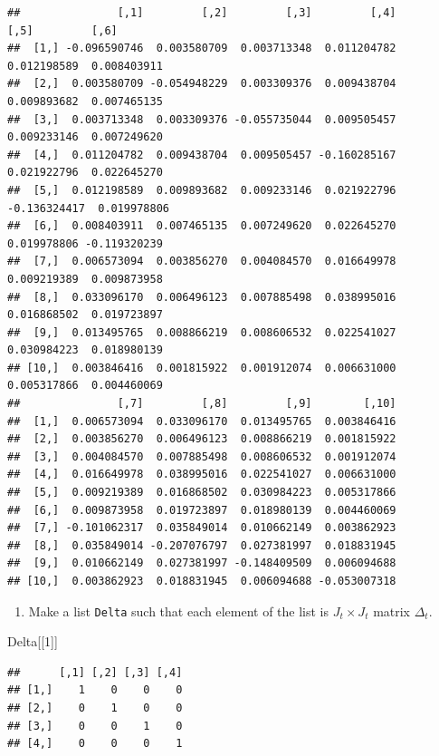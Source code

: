\documentclass[
]{book}
\newenvironment{Shaded}{\begin{snugshade}}{\end{snugshade}}
\newcommand{\DecValTok}[1]{\textcolor[rgb]{0.00,0.00,0.81}{#1}}
\newcommand{\NormalTok}[1]{#1}
\providecommand{\tightlist}{%
  \setlength{\itemsep}{0pt}\setlength{\parskip}{0pt}}
\begin{document}
\begin{verbatim}
##               [,1]         [,2]         [,3]         [,4]         [,5]         [,6]
##  [1,] -0.096590746  0.003580709  0.003713348  0.011204782  0.012198589  0.008403911
##  [2,]  0.003580709 -0.054948229  0.003309376  0.009438704  0.009893682  0.007465135
##  [3,]  0.003713348  0.003309376 -0.055735044  0.009505457  0.009233146  0.007249620
##  [4,]  0.011204782  0.009438704  0.009505457 -0.160285167  0.021922796  0.022645270
##  [5,]  0.012198589  0.009893682  0.009233146  0.021922796 -0.136324417  0.019978806
##  [6,]  0.008403911  0.007465135  0.007249620  0.022645270  0.019978806 -0.119320239
##  [7,]  0.006573094  0.003856270  0.004084570  0.016649978  0.009219389  0.009873958
##  [8,]  0.033096170  0.006496123  0.007885498  0.038995016  0.016868502  0.019723897
##  [9,]  0.013495765  0.008866219  0.008606532  0.022541027  0.030984223  0.018980139
## [10,]  0.003846416  0.001815922  0.001912074  0.006631000  0.005317866  0.004460069
##               [,7]         [,8]         [,9]        [,10]
##  [1,]  0.006573094  0.033096170  0.013495765  0.003846416
##  [2,]  0.003856270  0.006496123  0.008866219  0.001815922
##  [3,]  0.004084570  0.007885498  0.008606532  0.001912074
##  [4,]  0.016649978  0.038995016  0.022541027  0.006631000
##  [5,]  0.009219389  0.016868502  0.030984223  0.005317866
##  [6,]  0.009873958  0.019723897  0.018980139  0.004460069
##  [7,] -0.101062317  0.035849014  0.010662149  0.003862923
##  [8,]  0.035849014 -0.207076797  0.027381997  0.018831945
##  [9,]  0.010662149  0.027381997 -0.148409509  0.006094688
## [10,]  0.003862923  0.018831945  0.006094688 -0.053007318
\end{verbatim}

\begin{enumerate}
\def\labelenumi{\arabic{enumi}.}
\setcounter{enumi}{5}
\tightlist
\item
  Make a list \texttt{Delta} such that each element of the list is \(J_t \times J_t\) matrix \(\Delta_t\).
\end{enumerate}

\begin{Shaded}
\begin{Highlighting}[]
\NormalTok{Delta[[}\DecValTok{1}\NormalTok{]]}
\end{Highlighting}
\end{Shaded}

\begin{verbatim}
##      [,1] [,2] [,3] [,4]
## [1,]    1    0    0    0
## [2,]    0    1    0    0
## [3,]    0    0    1    0
## [4,]    0    0    0    1
\end{verbatim}
\end{document}
